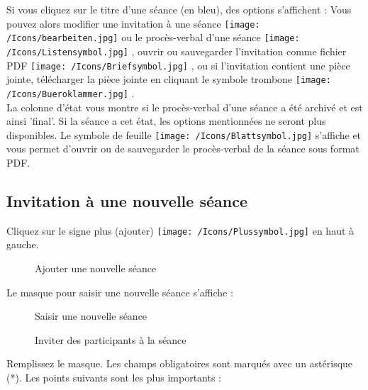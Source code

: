 Si vous cliquez sur le titre d'une séance (en bleu), des options s'affichent  : Vous pouvez alors modifier une invitation à une séance \texttt{[image: /Icons/bearbeiten.jpg]}  ou le procès-verbal d'une séance \texttt{[image: /Icons/Listensymbol.jpg]} , ouvrir ou sauvegarder l'invitation comme fichier PDF \texttt{[image: /Icons/Briefsymbol.jpg]} , ou si l'invitation contient une pièce jointe, télécharger la pièce jointe en cliquant le symbole trombone \texttt{[image: /Icons/Bueroklammer.jpg]} . \\
La colonne d'état  vous montre si le procès-verbal d'une séance a été archivé et est ainsi 'final'. Si la séance a cet état, les options mentionnées ne seront plus disponibles. Le symbole de feuille \texttt{[image: /Icons/Blattsymbol.jpg]} s'affiche et vous permet d'ouvrir ou de sauvegarder le procès-verbal de la séance sous format PDF.

\subsection{Invitation à une nouvelle séance}
\label{bkm:Ref434828480}

Cliquez sur le signe plus (ajouter) \texttt{[image: /Icons/Plussymbol.jpg]}  en haut à gauche.

\vspace{\baselineskip}

\begin{figure}[H]
\caption{Ajouter une nouvelle séance}
\end{figure}


Le masque pour saisir une nouvelle séance s'affiche :

\begin{figure}[H]
\caption{Saisir une nouvelle séance}
\end{figure}

\begin{figure}[H]
\caption{Inviter des participants à la séance}
\end{figure}

Remplissez le masque. Les champs obligatoires sont marqués avec un astérisque (*). Les points suivants sont les plus importants :

